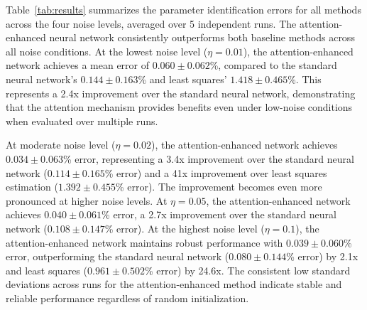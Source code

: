 \documentclass[Afour,sageh,times]{sagej}
\begin{document}
Table~\ref{tab:results} summarizes the parameter identification errors for all methods across the four noise levels, averaged over 5 independent runs. The attention-enhanced neural network consistently outperforms both baseline methods across all noise conditions. At the lowest noise level ($\eta = 0.01$), the attention-enhanced network achieves a mean error of $0.060 \pm 0.062$\%, compared to the standard neural network's $0.144 \pm 0.163$\% and least squares' $1.418 \pm 0.465$\%. This represents a 2.4x improvement over the standard neural network, demonstrating that the attention mechanism provides benefits even under low-noise conditions when evaluated over multiple runs.

At moderate noise level ($\eta = 0.02$), the attention-enhanced network achieves $0.034 \pm 0.063$\% error, representing a 3.4x improvement over the standard neural network ($0.114 \pm 0.165$\% error) and a 41x improvement over least squares estimation ($1.392 \pm 0.455$\% error). The improvement becomes even more pronounced at higher noise levels. At $\eta = 0.05$, the attention-enhanced network achieves $0.040 \pm 0.061$\% error, a 2.7x improvement over the standard neural network ($0.108 \pm 0.147$\% error). At the highest noise level ($\eta = 0.1$), the attention-enhanced network maintains robust performance with $0.039 \pm 0.060$\% error, outperforming the standard neural network ($0.080 \pm 0.144$\% error) by 2.1x and least squares ($0.961 \pm 0.502$\% error) by 24.6x. The consistent low standard deviations across runs for the attention-enhanced method indicate stable and reliable performance regardless of random initialization.

\begin{table}[t]
\small\sf\centering
\caption{Parameter identification errors (\%) across different noise levels. Results are averaged over 5 independent runs with different random seeds. Values shown as mean $\pm$ standard deviation. Lower values indicate better performance.}
\label{tab:results}
\end{table}
\end{document}
